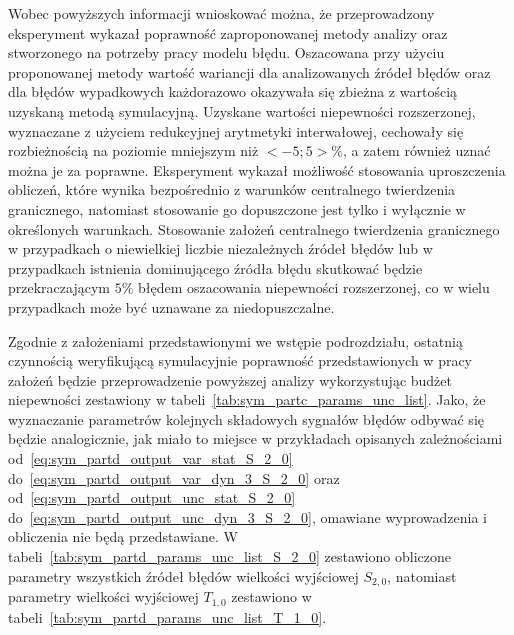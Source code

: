 Wobec powyższych informacji wnioskować można, że przeprowadzony eksperyment wykazał poprawność zaproponowanej metody analizy oraz stworzonego na potrzeby pracy modelu błędu. Oszacowana przy użyciu proponowanej metody wartość wariancji dla analizowanych źródeł błędów oraz dla błędów wypadkowych każdorazowo okazywała się zbieżna z wartością uzyskaną metodą symulacyjną. Uzyskane wartości niepewności rozszerzonej, wyznaczane z użyciem redukcyjnej arytmetyki interwałowej, cechowały się rozbieżnością na poziomie mniejszym niż $<-5;5> \%$, a zatem również uznać można je za poprawne. Eksperyment wykazał możliwość stosowania uproszczenia obliczeń, które wynika bezpośrednio z warunków centralnego twierdzenia granicznego, natomiast stosowanie go dopuszczone jest tylko i wyłącznie w określonych warunkach. Stosowanie założeń centralnego twierdzenia granicznego w przypadkach o niewielkiej liczbie niezależnych źródeł błędów lub w przypadkach istnienia dominującego źródła błędu skutkować będzie przekraczającym $5\%$ błędem oszacowania niepewności rozszerzonej, co w wielu przypadkach może być uznawane za niedopuszczalne.

Zgodnie z założeniami przedstawionymi we wstępie podrozdziału, ostatnią czynnością weryfikującą symulacyjnie poprawność przedstawionych w pracy założeń będzie przeprowadzenie powyższej analizy wykorzystując budżet niepewności zestawiony w tabeli~\ref{tab:sym_partc_params_unc_list}. Jako, że wyznaczanie parametrów kolejnych składowych sygnałów błędów odbywać się będzie analogicznie, jak miało to miejsce w przykładach opisanych zależnościami od~\eqref{eq:sym_partd_output_var_stat_S_2_0} do~\eqref{eq:sym_partd_output_var_dyn_3_S_2_0} oraz od~\eqref{eq:sym_partd_output_unc_stat_S_2_0} do~\eqref{eq:sym_partd_output_unc_dyn_3_S_2_0}, omawiane wyprowadzenia i obliczenia nie będą przedstawiane. W tabeli~\ref{tab:sym_partd_params_unc_list_S_2_0} zestawiono obliczone parametry wszystkich źródeł błędów wielkości wyjściowej $S_{2,0}$, natomiast parametry wielkości wyjściowej $T_{1,0}$ zestawiono w tabeli~\ref{tab:sym_partd_params_unc_list_T_1_0}.

